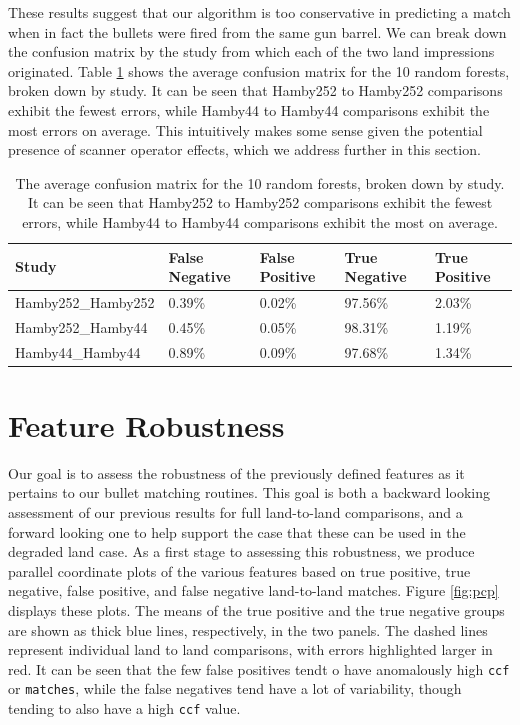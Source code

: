 \documentclass[12pt,]{article}
\theoremstyle{definition}
\theoremstyle{definition}
\theoremstyle{definition}
\theoremstyle{remark}
\begin{document}
These results suggest that our algorithm is too conservative in
predicting a match when in fact the bullets were fired from the same gun
barrel. We can break down the confusion matrix by the study from which
each of the two land impressions originated. Table
\ref{tab:avgforeststudy} shows the average confusion matrix for the 10
random forests, broken down by study. It can be seen that Hamby252 to
Hamby252 comparisons exhibit the fewest errors, while Hamby44 to Hamby44
comparisons exhibit the most errors on average. This intuitively makes
some sense given the potential presence of scanner operator effects,
which we address further in this section.

\begin{table}[H]
\centering
\begin{tabular}{lllll}
  \hline
Study & False Negative & False Positive & True Negative & True Positive \\ 
  \hline
Hamby252\_Hamby252 & 0.39\% & 0.02\% & 97.56\% & 2.03\% \\ 
  Hamby252\_Hamby44 & 0.45\% & 0.05\% & 98.31\% & 1.19\% \\ 
  Hamby44\_Hamby44 & 0.89\% & 0.09\% & 97.68\% & 1.34\% \\ 
   \hline
\end{tabular}
\caption{The average confusion matrix for the 10 random forests, broken down by study. It can be seen that Hamby252 to Hamby252 comparisons exhibit the fewest errors, while Hamby44 to Hamby44 comparisons exhibit the most on average.} 
\label{tab:avgforeststudy}
\end{table}

\section{Feature Robustness}\label{feature-robustness}

Our goal is to assess the robustness of the previously defined features
as it pertains to our bullet matching routines. This goal is both a
backward looking assessment of our previous results for full
land-to-land comparisons, and a forward looking one to help support the
case that these can be used in the degraded land case. As a first stage
to assessing this robustness, we produce parallel coordinate plots of
the various features based on true positive, true negative, false
positive, and false negative land-to-land matches. Figure \ref{fig:pcp}
displays these plots. The means of the true positive and the true
negative groups are shown as thick blue lines, respectively, in the two
panels. The dashed lines represent individual land to land comparisons,
with errors highlighted larger in red. It can be seen that the few false
positives tendt o have anomalously high \texttt{ccf} or
\texttt{matches}, while the false negatives tend have a lot of
variability, though tending to also have a high \texttt{ccf} value.
\end{document}
